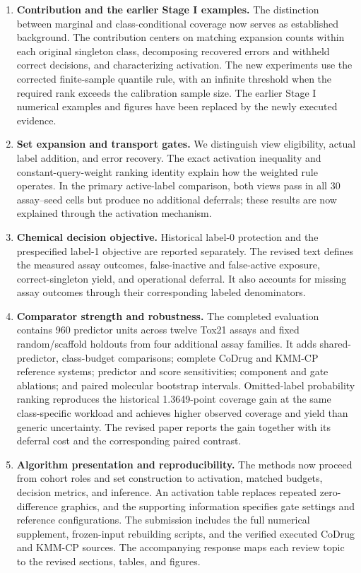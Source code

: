 \begin{enumerate}
\item \textbf{Contribution and the earlier Stage I examples.} The distinction between marginal and class-conditional coverage now serves as established background. The contribution centers on matching expansion counts within each original singleton class, decomposing recovered errors and withheld correct decisions, and characterizing activation. The new experiments use the corrected finite-sample quantile rule, with an infinite threshold when the required rank exceeds the calibration sample size. The earlier Stage I numerical examples and figures have been replaced by the newly executed evidence.

\item \textbf{Set expansion and transport gates.} We distinguish view eligibility, actual label addition, and error recovery. The exact activation inequality and constant-query-weight ranking identity explain how the weighted rule operates. In the primary active-label comparison, both views pass in all 30 assay--seed cells but produce no additional deferrals; these results are now explained through the activation mechanism.

\item \textbf{Chemical decision objective.} Historical label-0 protection and the prespecified label-1 objective are reported separately. The revised text defines the measured assay outcomes, false-inactive and false-active exposure, correct-singleton yield, and operational deferral. It also accounts for missing assay outcomes through their corresponding labeled denominators.

\item \textbf{Comparator strength and robustness.} The completed evaluation contains 960 predictor units across twelve Tox21 assays and fixed random/scaffold holdouts from four additional assay families. It adds shared-predictor, class-budget comparisons; complete CoDrug and KMM-CP reference systems; predictor and score sensitivities; component and gate ablations; and paired molecular bootstrap intervals. Omitted-label probability ranking reproduces the historical 1.3649-point coverage gain at the same class-specific workload and achieves higher observed coverage and yield than generic uncertainty. The revised paper reports the gain together with its deferral cost and the corresponding paired contrast.

\newpage
\item \textbf{Algorithm presentation and reproducibility.} The methods now proceed from cohort roles and set construction to activation, matched budgets, decision metrics, and inference. An activation table replaces repeated zero-difference graphics, and the supporting information specifies gate settings and reference configurations. The submission includes the full numerical supplement, frozen-input rebuilding scripts, and the verified executed CoDrug and KMM-CP sources. The accompanying response maps each review topic to the revised sections, tables, and figures.
\end{enumerate}

